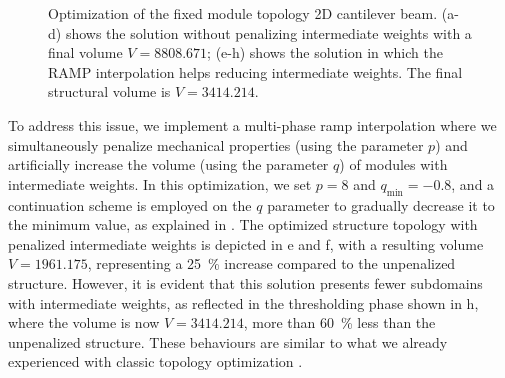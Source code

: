 \begin{figure}
    \hfill
    \hfill
    \hfill
    \caption{Optimization of the fixed module topology 2D cantilever beam. (a-d) shows the solution without penalizing intermediate weights with a final volume $V = 8808.671$; (e-h) shows the solution in which the RAMP interpolation helps reducing intermediate weights. The final structural volume is $V = 3414.214$.}
    \label{fig:06_fixed_module}
\end{figure}

To address this issue, we implement a multi-phase \gls{ramp} interpolation where we simultaneously penalize mechanical properties (using the parameter $p$) and artificially increase the volume (using the parameter $q$) of modules with intermediate weights. In this optimization, we set $p=8$ and $q_{\text{min}}=-0.8$, and a continuation scheme is employed on the $q$ parameter to gradually decrease it to the minimum value, as explained in . The optimized structure topology with penalized intermediate weights is depicted in e and f, with a resulting volume $V = 1961.175$, representing a \qty{25}{\%} increase compared to the unpenalized structure. However, it is evident that this solution presents fewer subdomains with intermediate weights, as reflected in the thresholding phase shown in h, where the volume is now $V=3414.214$, more than \qty{60}{\%} less than the unpenalized structure. These behaviours are similar to what we already experienced with classic topology optimization .


